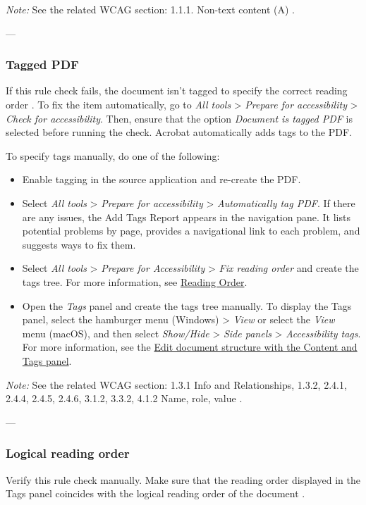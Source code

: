 \vspace{0.5em}
\noindent\textit{Note:} See the related WCAG section: 1.1.1. Non-text content (A) \cite{WCAG}.

---

\subsubsection{Tagged PDF}
\label{subsubsec:acrobat-tagged-pdf}
If this rule check fails, the document isn't tagged to specify the correct reading order \cite{AdobeHelpX}.
To fix the item automatically, go to \emph{All tools} > \emph{Prepare for accessibility} > \emph{Check for accessibility}. Then, ensure that the option \emph{Document is tagged PDF} is selected before running the check. Acrobat automatically adds tags to the PDF.

To specify tags manually, do one of the following:
\begin{itemize}
    \item Enable tagging in the source application and re-create the PDF.
    \item Select \emph{All tools} > \emph{Prepare for accessibility} > \emph{Automatically tag PDF}. If there are any issues, the Add Tags Report appears in the navigation pane. It lists potential problems by page, provides a navigational link to each problem, and suggests ways to fix them.
    \item Select \emph{All tools} > \emph{Prepare for Accessibility} > \emph{Fix reading order} and create the tags tree. For more information, see \hyperref[sec:reading-order]{Reading Order}.
    \item Open the \emph{Tags} panel and create the tags tree manually. To display the Tags panel, select the hamburger menu (Windows) > \emph{View} or select the \emph{View} menu (macOS), and then select \emph{Show/Hide} > \emph{Side panels} > \emph{Accessibility tags}. For more information, see the \hyperref[sec:edit-structure]{Edit document structure with the Content and Tags panel}.
\end{itemize}

\vspace{0.5em}
\noindent\textit{Note:} See the related WCAG section: 1.3.1 Info and Relationships, 1.3.2, 2.4.1, 2.4.4, 2.4.5, 2.4.6, 3.1.2, 3.3.2, 4.1.2 Name, role, value \cite{WCAG}.

---

\subsubsection{Logical reading order}
\label{subsubsec:acrobat-logical-order}
Verify this rule check manually. Make sure that the reading order displayed in the Tags panel coincides with the logical reading order of the document \cite{AdobeHelpX}.

